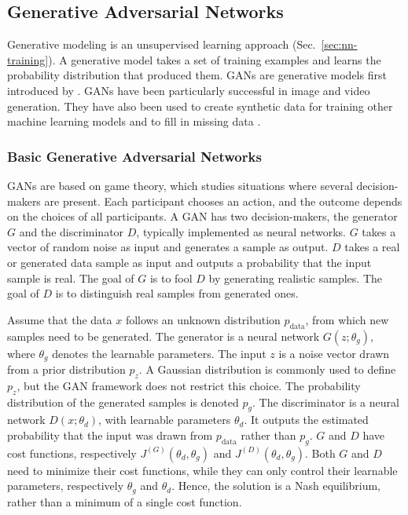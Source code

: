 \subsection{Generative Adversarial Networks}\label{sec:gans}
Generative modeling is an unsupervised learning approach (Sec.~\ref{sec:nn-training}). A generative model takes a set of training examples and learns the probability distribution that produced them. GANs are generative models first introduced by \textcite{goodfellowGenerativeAdversarialNetworks2014}.
GANs have been particularly successful in image and video generation. They have also been used to create synthetic data for training other machine learning models and to fill in missing data \parencite{goodfellowGenerativeAdversarialNetworks2020}.

\subsubsection{Basic Generative Adversarial Networks}\label{sec:basic-gan}

GANs are based on game theory, which studies situations where several decision-makers are present. Each participant chooses an action, and the outcome depends on the choices of all participants. A GAN has two decision-makers, the generator $G$ and the discriminator $D$, typically implemented as neural networks. $G$ takes a vector of random noise as input and generates a sample as output. $D$ takes a real or generated data sample as input and outputs a probability that the input sample is real. The goal of $G$ is to fool $D$ by generating realistic samples. The goal of $D$ is to distinguish real samples from generated ones.

Assume that the data $x$ follows an unknown distribution $p_{\mathrm{data}}$, from which new samples need to be generated. The generator is a neural network $G(z; \theta_g)$, where $\theta_g$ denotes the learnable parameters. The input $z$ is a noise vector drawn from a prior distribution $p_z$. A Gaussian distribution is commonly used to define $p_z$, but the GAN framework does not restrict this choice. The probability distribution of the generated samples is denoted $p_g$. The discriminator is a neural network $D(x; \theta_d)$, with learnable parameters $\theta_d$. It outputs the estimated probability that the input was drawn from $p_{\mathrm{data}}$ rather than $p_{g}$. $G$ and $D$ have cost functions, respectively $J^{(G)}(\theta_d, \theta_g)$ and $J^{(D)}(\theta_d, \theta_g)$. Both $G$ and $D$ need to minimize their cost functions, while they can only control their learnable parameters, respectively $\theta_g$ and $\theta_d$. Hence, the solution is a Nash equilibrium, rather than a minimum of a single cost function.

